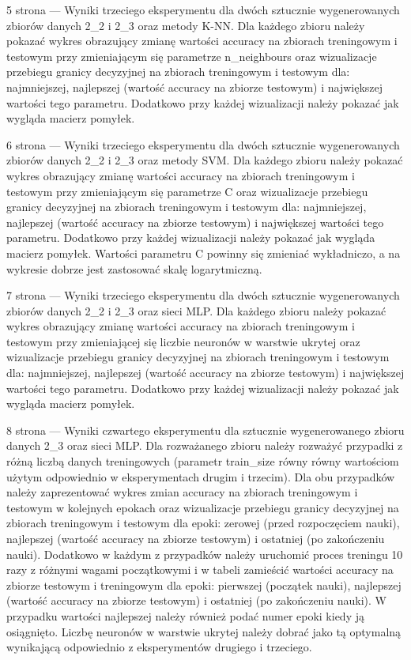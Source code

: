 \documentclass[12pt]{article}
\begin{document}
\clearpage

5 strona --- Wyniki trzeciego eksperymentu dla dwóch sztucznie wygenerowanych zbiorów danych 2\_2 i 2\_3 oraz metody K-NN. Dla każdego zbioru należy pokazać wykres obrazujący zmianę wartości accuracy na zbiorach treningowym i testowym przy zmieniającym się parametrze n\_neighbours oraz wizualizacje przebiegu granicy decyzyjnej na zbiorach treningowym i testowym dla: najmniejszej, najlepszej (wartość accuracy na zbiorze testowym) i największej wartości tego parametru. Dodatkowo przy każdej wizualizacji należy pokazać jak wygląda macierz pomyłek.

\clearpage

6 strona --- Wyniki trzeciego eksperymentu dla dwóch sztucznie wygenerowanych zbiorów danych 2\_2 i 2\_3 oraz metody SVM. Dla każdego zbioru należy pokazać wykres obrazujący zmianę wartości accuracy na zbiorach treningowym i testowym przy zmieniającym się parametrze C oraz wizualizacje przebiegu granicy decyzyjnej na zbiorach treningowym i testowym dla: najmniejszej, najlepszej (wartość accuracy na zbiorze testowym) i największej wartości tego parametru. Dodatkowo przy każdej wizualizacji należy pokazać jak wygląda macierz pomyłek. Wartości parametru C powinny się zmieniać wykładniczo, a na wykresie dobrze jest zastosować skalę logarytmiczną.

\clearpage

7 strona --- Wyniki trzeciego eksperymentu dla dwóch sztucznie wygenerowanych zbiorów danych 2\_2 i 2\_3 oraz sieci MLP. Dla każdego zbioru należy pokazać wykres obrazujący zmianę wartości accuracy na zbiorach treningowym i testowym przy zmieniającej się liczbie neuronów w warstwie ukrytej oraz wizualizacje przebiegu granicy decyzyjnej na zbiorach treningowym i testowym dla: najmniejszej, najlepszej (wartość accuracy na zbiorze testowym) i największej wartości tego parametru. Dodatkowo przy każdej wizualizacji należy pokazać jak wygląda macierz pomyłek.

\clearpage

8 strona --- Wyniki czwartego eksperymentu dla sztucznie wygenerowanego zbioru danych 2\_3 oraz sieci MLP. Dla rozważanego zbioru należy rozważyć przypadki z różną liczbą danych treningowych (parametr train\_size równy równy wartościom użytym odpowiednio w eksperymentach drugim i trzecim). Dla obu przypadków należy zaprezentować wykres zmian accuracy na zbiorach treningowym i testowym w kolejnych epokach oraz wizualizacje przebiegu granicy decyzyjnej na zbiorach treningowym i testowym dla epoki: zerowej (przed rozpoczęciem nauki), najlepszej (wartość accuracy na zbiorze testowym) i ostatniej (po zakończeniu nauki).
Dodatkowo w każdym z przypadków należy uruchomić proces treningu 10 razy z różnymi wagami początkowymi i w tabeli zamieścić wartości accuracy na zbiorze testowym i treningowym dla epoki: pierwszej (początek nauki), najlepszej (wartość accuracy na zbiorze testowym) i ostatniej (po zakończeniu nauki). W przypadku wartości najlepszej należy również podać numer epoki kiedy ją osiągnięto. Liczbę neuronów w warstwie ukrytej należy dobrać jako tą optymalną wynikającą odpowiednio z eksperymentów drugiego i trzeciego.
\end{document}
